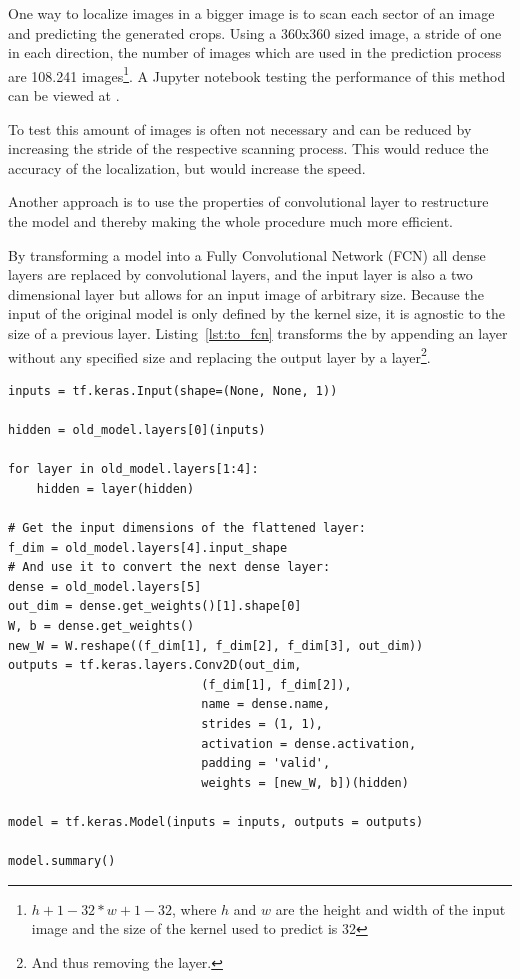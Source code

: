 One way to localize images in a bigger image is to scan each sector of an image and predicting the generated crops.
Using a 360x360 sized image, a stride of one in each direction, the number of images which are used in the prediction process are 108.241 images\footnote{$h + 1 - 32 * w + 1 - 32$, where $h$ and $w$ are the height and width of the input image and the size of the kernel used to predict is 32}.
A Jupyter notebook testing the performance of this method can be viewed at .

To test this amount of images is often not necessary and can be reduced by increasing the stride of the respective scanning process.
This would reduce the accuracy of the localization, but would increase the speed.

Another approach is to use the properties of convolutional layer to restructure the model and thereby making the whole procedure much more efficient.

By transforming a model into a Fully Convolutional Network (FCN) all dense layers are replaced by convolutional layers, and the input layer is also a two dimensional layer but allows for an input image of arbitrary size.
Because the input of the original model is only defined by the kernel size, it is agnostic to the size of a previous layer.
Listing~\ref{lst:to_fcn} transforms the  by appending an  layer without any specified size and replacing the output layer by a  layer\footnote{And thus removing the  layer.}.

\begin{lstlisting}[caption={Transformation of the Symbol Classifier into a FCN.}, label=lst:to_fcn]
inputs = tf.keras.Input(shape=(None, None, 1))

hidden = old_model.layers[0](inputs)

for layer in old_model.layers[1:4]:
    hidden = layer(hidden)

# Get the input dimensions of the flattened layer:
f_dim = old_model.layers[4].input_shape
# And use it to convert the next dense layer:
dense = old_model.layers[5]
out_dim = dense.get_weights()[1].shape[0]
W, b = dense.get_weights()
new_W = W.reshape((f_dim[1], f_dim[2], f_dim[3], out_dim))
outputs = tf.keras.layers.Conv2D(out_dim,
                           (f_dim[1], f_dim[2]),
                           name = dense.name,
                           strides = (1, 1),
                           activation = dense.activation,
                           padding = 'valid',
                           weights = [new_W, b])(hidden)

model = tf.keras.Model(inputs = inputs, outputs = outputs)

model.summary()
\end{lstlisting}

